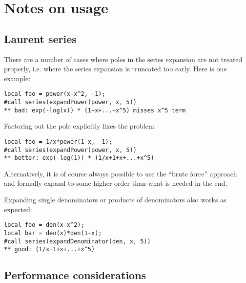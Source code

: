 \documentclass[titlepage]{article}
\begin{document}
\section{Notes on usage}
\label{sec:usage_notes}

\subsection{Laurent series}
\label{sec:laurent}

There are a number of cases where poles in the series expansion are not
treated properly, i.e. where the series expansion is truncated too
early. Here is one example:
\begin{lstlisting}
local foo = power(x-x^2, -1);
#call series(expandPower(power, x, 5))
** bad: exp(-log(x)) * (1+x+...+x^5) misses x^5 term
\end{lstlisting}
Factoring out the pole explicitly fixes the problem:
\begin{lstlisting}
local foo = 1/x*power(1-x, -1);
#call series(expandPower(power, x, 5))
** better: exp(-log(1)) * (1/x+1+x+...+x^5)
\end{lstlisting}
Alternatively, it is of course always possible to use the ``brute
force'' approach and formally expand to some higher order than what is
needed in the end.

Expanding single denominators or products of denominators also works as
expected:
\begin{lstlisting}
local foo = den(x-x^2);
local bar = den(x)*den(1-x);
#call series(expandDenominator(den, x, 5))
** good: (1/x+1+x+...+x^5)
\end{lstlisting}

\subsection{Performance considerations}
\label{sec:perf}
\end{document}
